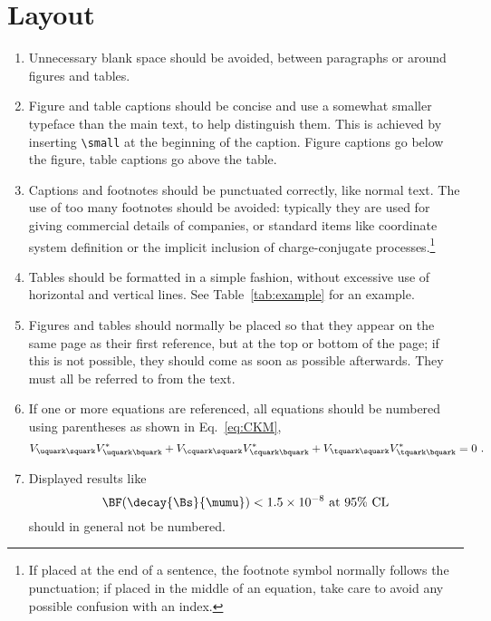 \section{Layout}

\begin{enumerate}

\item Unnecessary blank space should be avoided, between paragraphs or
  around figures and tables.

\item Figure and table captions should be concise and use a somewhat smaller typeface
  than the main text, to help distinguish them. This is achieved by 
  inserting \verb!\small! at the beginning of the caption.
  Figure captions go below the figure, table captions go above the
  table.

\item Captions and footnotes should be punctuated correctly, like
  normal text. The use of too many footnotes should be avoided:
  typically they are used for giving commercial details of companies,
  or standard items like coordinate system definition or the implicit
  inclusion of charge-conjugate processes.\footnote{If placed at the end
    of a sentence, the footnote symbol normally follows the
    punctuation; if placed in the middle of an equation, take care to
    avoid any possible confusion with an index.}

\item Tables should be formatted in a simple fashion, without
  excessive use of horizontal and vertical lines. See
  Table~\ref{tab:example} for an example.

\item Figures and tables should normally be placed so that they appear
  on the same page as their first reference, but at the top or bottom
  of the page; if this is not possible, they should come as soon as
  possible afterwards.  They must all be referred to from the text.

\item If one or more equations are referenced, all equations should be numbered using parentheses as shown in
  Eq.~\ref{eq:CKM},
  \begin{equation}
    \label{eq:CKM}
    V_{\uquark\squark}V_{\uquark\bquark}^* + 
    V_{\cquark\squark}V_{\cquark\bquark}^* + 
    V_{\tquark\squark}V_{\tquark\bquark}^* = 0 \ . 
  \end{equation}
  
\item Displayed results like
  \begin{equation*}
    \BF(\decay{\Bs}{\mumu}) < 1.5 \times 10^{-8} \text{ at 95\% CL}
  \end{equation*}
  should in general not be numbered.


\end{enumerate}

